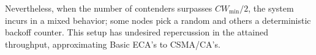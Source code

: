 \documentclass[portrait,a0paper]{baposter}
\begin{document}
\begin{poster}
{Nevertheless, when the number of contenders surpasses $CW_{\min}/2$, the system incurs in a mixed behavior; some nodes pick a random and others a deterministic backoff counter. This setup has undesired repercussion in the attained throughput, approximating Basic ECA's to CSMA/CA's.

}

% 
% 
% 

\end{poster}
\end{document}
